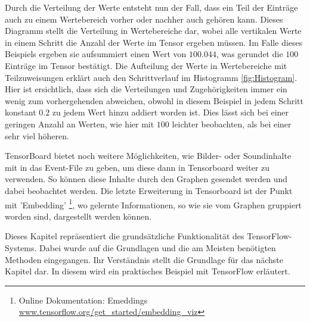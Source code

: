 Durch die Verteilung der Werte entsteht nun der Fall, dass ein Teil der Einträge auch zu einem Wertebereich vorher oder nachher auch gehören kann. 
Dieses Diagramm stellt die Verteilung in Wertebereiche dar, wobei alle vertikalen Werte in einem Schritt die Anzahl der Werte im Tensor ergeben müssen. 
Im Falle dieses Beispiels ergeben sie aufsummiert einen Wert von $100.044$, was gerundet die $100$ Einträge im Tensor bestätigt. 
Die Aufteilung der Werte in Wertebereiche mit Teilzuweisungen erklärt auch den Schrittverlauf im Histogramm \ref{fig:Histogram}. 
Hier ist ersichtlich, dass sich die Verteilungen und Zugehörigkeiten immer ein wenig zum vorhergehenden abweichen, obwohl in diesem Beispiel in jedem Schritt konstant $0.2$ zu jedem Wert hinzu addiert worden ist. 
Dies lässt sich bei einer geringen Anzahl an Werten, wie hier mit $100$ leichter beobachten, als bei einer sehr viel höheren. 
\phantom \newline

\noindent
TensorBoard bietet noch weitere Möglichkeiten, wie Bilder- oder Soundinhalte mit in das Event-File zu geben, um diese dann in Tensorboard weiter zu verwenden. 
So können diese Inhalte durch den Graphen gesendet werden und dabei beobachtet werden. 
Die letzte Erweiterung in Tensorboard ist der Punkt mit 'Embedding' \footnote{Online Dokumentation: Emeddings \url{www.tensorflow.org/get_started/embedding_viz}}, wo gelernte Informationen, so wie sie vom Graphen gruppiert worden sind, dargestellt werden können. 
\phantom \newline

\noindent
Dieses Kapitel repräsentiert die grundsätzliche Funktionalität des TensorFlow-Systems. 
Dabei wurde auf die Grundlagen und die am Meisten benötigten Methoden eingegangen. 
Ihr Verständnis stellt die Grundlage für das nächste Kapitel dar. 
In diesem wird ein praktisches Beispiel mit TensorFlow erläutert. 








